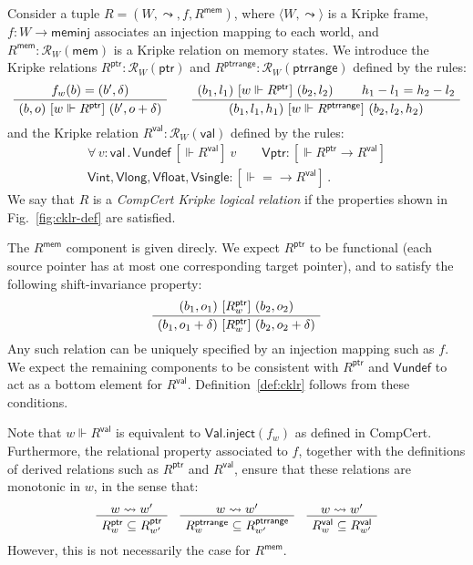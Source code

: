 \documentclass[acmsmall,timestamp,review]{acmart}
\newcommand{\kw}[1]{\ensuremath{ \mathsf{#1} }}
\newcommand{\ifr}[1]{\ [{#1}]\ }
\begin{document}
\begin{definition} \label{def:cklr} %
Consider a tuple $R = (W, \leadsto, f, R^\kw{mem})$,
where
$\langle W, \leadsto \rangle$ is a Kripke frame,
$f : W \rightarrow \kw{meminj}$
associates an injection mapping to each world, and
$R^\kw{mem} : \mathcal{R}_{W}(\kw{mem})$
is a Kripke relation on memory states.
We introduce the Kripke relations
$R^\kw{ptr} : \mathcal{R}_W(\kw{ptr})$ and
$R^\kw{ptrrange} : \mathcal{R}_W(\kw{ptrrange})$
defined by the rules:
\[
  \AxiomC{$f_w(b) = (b', \delta)$}
  \UnaryInfC{$(b, o) \ifr{w \Vdash R^\kw{ptr}} (b', o + \delta)$}
  \DisplayProof
  \qquad
  \AxiomC{$(b_1, l_1) \ifr{w \Vdash R^\kw{ptr}} (b_2, l_2)$}
  \AxiomC{$h_1 - l_1 = h_2 - l_2$}
  \BinaryInfC{$(b_1, l_1, h_1) \ifr{w \Vdash R^\kw{ptrrange}} (b_2, l_2, h_2)$}
  \DisplayProof
\]
and the Kripke relation
$R^\kw{val} : \mathcal{R}_W(\kw{val})$
defined by the rules:
\begin{gather*}
  \forall \, v : \kw{val} \,.\,
    \kw{Vundef} \ifr{\Vdash R^\kw{val}} v \qquad
  \kw{Vptr} : {}
    [\Vdash R^\kw{ptr} \rightarrow R^\kw{val}] \\
  \kw{Vint}, \kw{Vlong}, \kw{Vfloat}, \kw{Vsingle} :
    [\Vdash {=} \rightarrow R^\kw{val}] \,.
\end{gather*}
We say that $R$ is a \emph{CompCert Kripke logical relation}
if the properties shown in Fig.~\ref{fig:cklr-def} are satisfied.
\end{definition}

The $R^\kw{mem}$ component is given direcly.
We expect $R^\kw{ptr}$ to be functional
(each source pointer has at most one corresponding target pointer),
and to satisfy the following shift-invariance property:
\[
  \AxiomC{$(b_1, o_1) \ifr{R^\kw{ptr}_w} (b_2, o_2)$}
  \UnaryInfC{$(b_1, o_1 + \delta) \ifr{R^\kw{ptr}_w} (b_2, o_2 + \delta)$}
  \DisplayProof
\]
Any such relation can be uniquely specified by
an injection mapping such as $f$.
We expect the remaining components to be consistent with $R^\kw{ptr}$
and $\kw{Vundef}$ to act as a bottom element for $R^\kw{val}$.
Definition~\ref{def:cklr} follows from these conditions.

Note that $w \Vdash R^\kw{val}$
is equivalent to $\kw{Val.inject}(f_w)$
as defined in CompCert.
Furthermore, the relational property associated to $f$,
together with the definitions of
derived relations such as $R^\kw{ptr}$ and $R^\kw{val}$,
ensure that these relations are monotonic in $w$,
in the sense that:
\[
  \AxiomC{$w \leadsto w'$}
  \UnaryInfC{$R^\kw{ptr}_w \subseteq R^\kw{ptr}_{w'}$}
  \DisplayProof
  \quad
  \AxiomC{$w \leadsto w'$}
  \UnaryInfC{$R^\kw{ptrrange}_w \subseteq R^\kw{ptrrange}_{w'}$}
  \DisplayProof
  \quad
  \AxiomC{$w \leadsto w'$}
  \UnaryInfC{$R^\kw{val}_w \subseteq R^\kw{val}_{w'}$}
  \DisplayProof
\]
However,
this is not necessarily the case for $R^\kw{mem}$.
\end{document}
